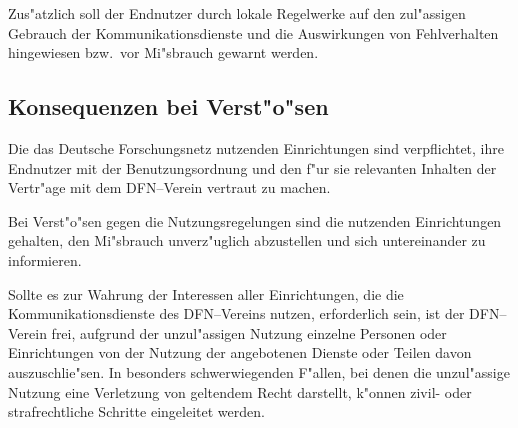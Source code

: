 Zus"atzlich soll der Endnutzer durch lokale Regelwerke auf den zul"assigen
Gebrauch der Kommunikationsdienste und die Auswirkungen von Fehlverhalten
hingewiesen bzw.\  vor Mi"sbrauch gewarnt werden.

\subsection{Konsequenzen bei Verst"o"sen}

Die das Deutsche Forschungsnetz nutzenden Einrichtungen sind verpflichtet,
ihre Endnutzer mit der Benutzungsordnung und den f"ur sie relevanten Inhalten
der Vertr"age mit dem DFN--Verein vertraut zu machen.

Bei Verst"o"sen gegen die Nutzungsregelungen sind die nutzenden Einrichtungen
gehalten, den Mi"sbrauch unverz"uglich abzustellen und sich untereinander zu
informieren.

Sollte es zur Wahrung der Interessen aller Einrichtungen, die die
Kommunikationsdienste des DFN--Vereins nutzen, erforderlich sein, ist der
DFN--Verein frei, aufgrund der unzul"assigen Nutzung einzelne Personen oder
Einrichtungen von der Nutzung der angebotenen Dienste oder Teilen davon
auszuschlie"sen. In besonders schwerwiegenden F"allen, bei denen die
unzul"assige Nutzung eine Verletzung von geltendem Recht darstellt, k"onnen
zivil- oder strafrechtliche Schritte eingeleitet werden.
